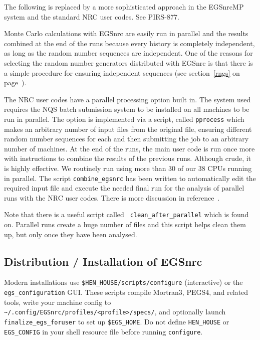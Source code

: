 The following is replaced by a more sophisticated approach in the EGSnrcMP
system and the standard NRC user codes. See PIRS-877\cite{Ka03}.

Monte Carlo calculations with EGSnrc are easily run in parallel and the
results combined at the end of the runs because every history is completely
independent, as long as the random number sequences are independent. One of
the reasons for selecting the random number generators distributed with
EGSnrc is that there is a simple procedure for ensuring independent
sequences (see section~\ref{rngs} on page~\pageref{rngs}).

The NRC user codes\cite{Ro00} have a parallel processing option built in.
The system used requires the NQS batch submission system to be installed on
all machines to be run in parallel. The option is implemented via a script,
called {\tt pprocess} which makes an arbitrary number of input files from
the original file, ensuring different random number sequences for each and
then submitting the job to an arbitrary number of machines.  At the end of
the runs, the main user code is run once more with instructions to combine
the results of the previous runs.  Although crude, it is highly effective.
We routinely run using more than 30 of our 38 CPUs running in parallel.
The script {\tt combine\_egsnrc} has been written to automatically edit the
required input file and execute the needed final run for the analysis of
parallel runs with the NRC user codes.
There is more discussion in reference~\cite{Ro00}.

Note that there is a useful script called {\tt
clean\_after\_parallel} which is found on.
Parallel runs create a huge number of files and this script helps clean
them up, but only once they have been analysed.


\subsection{Distribution / Installation of EGSnrc}
\label{install}


Modern installations use \verb+$HEN_HOUSE/scripts/configure+ (interactive) or
the \verb+egs_configuration+ GUI. These scripts compile Mortran3, PEGS4,
and related tools, write your machine config to
\verb+~/.config/EGSnrc/profiles/<profile>/specs/+, and optionally launch
\verb+finalize_egs_foruser+ to set up \verb+$EGS_HOME+.
Do not define \verb+HEN_HOUSE+ or \verb+EGS_CONFIG+ in your shell resource
file before running \verb+configure+.

